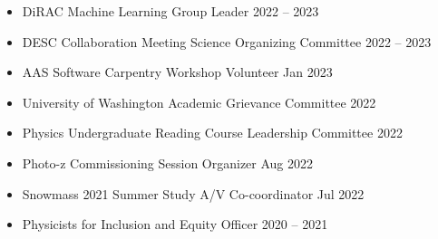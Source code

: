 \begin{itemize}
    \item DiRAC Machine Learning Group Leader \hfill 2022 -- 2023

    \item DESC Collaboration Meeting Science Organizing Committee \hfill 2022 -- 2023

    \item AAS Software Carpentry Workshop Volunteer \hfill Jan 2023

    \item University of Washington Academic Grievance Committee \hfill 2022

    \item Physics Undergraduate Reading Course Leadership Committee \hfill 2022

    \item Photo-z Commissioning Session Organizer \hfill Aug 2022

    \item Snowmass 2021 Summer Study A/V Co-coordinator \hfill Jul 2022

    \item Physicists for Inclusion and Equity Officer \hfill 2020 -- 2021
\end{itemize}